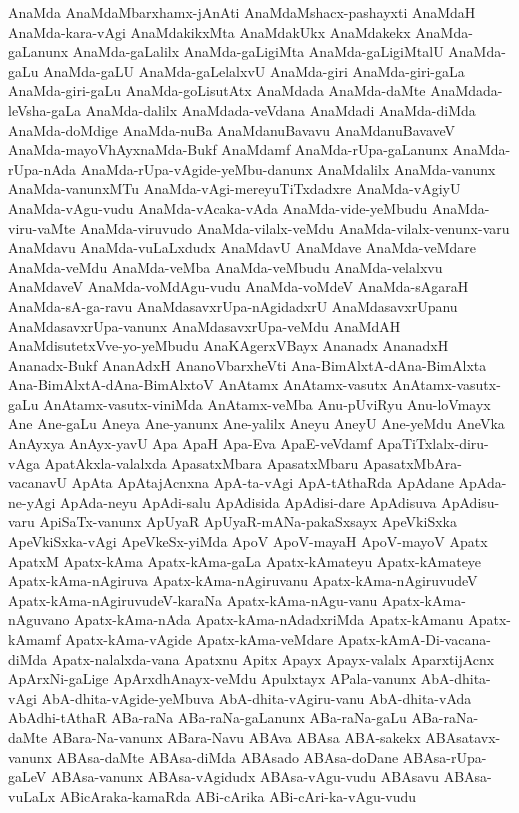 {AnaMda
AnaMdaMbarxhamx-jAnAti
AnaMdaMshacx-pashayxti
AnaMdaH
AnaMda-kara-vAgi
AnaMdakikxMta
AnaMdakUkx
AnaMdakekx
AnaMda-gaLanunx
AnaMda-gaLalilx
AnaMda-gaLigiMta
AnaMda-gaLigiMtalU
AnaMda-gaLu
AnaMda-gaLU
AnaMda-gaLelalxvU
AnaMda-giri
AnaMda-giri-gaLa
AnaMda-giri-gaLu
AnaMda-goLisutAtx
AnaMdada
AnaMda-daMte
AnaMdada-leVsha-gaLa
AnaMda-dalilx
AnaMdada-veVdana
AnaMdadi
AnaMda-diMda
AnaMda-doMdige
AnaMda-nuBa
AnaMdanuBavavu
AnaMdanuBavaveV
AnaMda-mayoVhAyxnaMda-Bukf
AnaMdamf
AnaMda-rUpa-gaLanunx
AnaMda-rUpa-nAda
AnaMda-rUpa-vAgide-yeMbu-danunx
AnaMdalilx
AnaMda-vanunx
AnaMda-vanunxMTu
AnaMda-vAgi-mereyuTiTxdadxre
AnaMda-vAgiyU
AnaMda-vAgu-vudu
AnaMda-vAcaka-vAda
AnaMda-vide-yeMbudu
AnaMda-viru-vaMte
AnaMda-viruvudo
AnaMda-vilalx-veMdu
AnaMda-vilalx-venunx-varu
AnaMdavu
AnaMda-vuLaLxdudx
AnaMdavU
AnaMdave
AnaMda-veMdare
AnaMda-veMdu
AnaMda-veMba
AnaMda-veMbudu
AnaMda-velalxvu
AnaMdaveV
AnaMda-voMdAgu-vudu
AnaMda-voMdeV
AnaMda-sAgaraH
AnaMda-sA-ga-ravu
AnaMdasavxrUpa-nAgidadxrU
AnaMdasavxrUpanu
AnaMdasavxrUpa-vanunx
AnaMdasavxrUpa-veMdu
AnaMdAH
AnaMdisutetxVve-yo-yeMbudu
AnaKAgerxVBayx
Ananadx
AnanadxH
Ananadx-Bukf
AnanAdxH
AnanoVbarxheVti
Ana-BimAlxtA-dAna-BimAlxta
Ana-BimAlxtA-dAna-BimAlxtoV
AnAtamx
AnAtamx-vasutx
AnAtamx-vasutx-gaLu
AnAtamx-vasutx-viniMda
AnAtamx-veMba
Anu-pUviRyu
Anu-loVmayx
Ane
Ane-gaLu
Aneya
Ane-yanunx
Ane-yalilx
Aneyu
AneyU
Ane-yeMdu
AneVka
AnAyxya
AnAyx-yavU
Apa
ApaH
Apa-Eva
ApaE-veVdamf
ApaTiTxlalx-diru-vAga
ApatAkxla-valalxda
ApasatxMbara
ApasatxMbaru
ApasatxMbAra-vacanavU
ApAta
ApAtajAcnxna
ApA-ta-vAgi
ApA-tAthaRda
ApAdane
ApAda-ne-yAgi
ApAda-neyu
ApAdi-salu
ApAdisida
ApAdisi-dare
ApAdisuva
ApAdisu-varu
ApiSaTx-vanunx
ApUyaR
ApUyaR-mANa-pakaSxsayx
ApeVkiSxka
ApeVkiSxka-vAgi
ApeVkeSx-yiMda
ApoV
ApoV-mayaH
ApoV-mayoV
Apatx
ApatxM
Apatx-kAma
Apatx-kAma-gaLa
Apatx-kAmateyu
Apatx-kAmateye
Apatx-kAma-nAgiruva
Apatx-kAma-nAgiruvanu
Apatx-kAma-nAgiruvudeV
Apatx-kAma-nAgiruvudeV-karaNa
Apatx-kAma-nAgu-vanu
Apatx-kAma-nAguvano
Apatx-kAma-nAda
Apatx-kAma-nAdadxriMda
Apatx-kAmanu
Apatx-kAmamf
Apatx-kAma-vAgide
Apatx-kAma-veMdare
Apatx-kAmA-Di-vacana-diMda
Apatx-nalalxda-vana
Apatxnu
Apitx
Apayx
Apayx-valalx
AparxtijAcnx
ApArxNi-gaLige
ApArxdhAnayx-veMdu
Apulxtayx
APala-vanunx
AbA-dhita-vAgi
AbA-dhita-vAgide-yeMbuva
AbA-dhita-vAgiru-vanu
AbA-dhita-vAda
AbAdhi-tAthaR
ABa-raNa
ABa-raNa-gaLanunx
ABa-raNa-gaLu
ABa-raNa-daMte
ABara-Na-vanunx
ABara-Navu
ABAva
ABAsa
ABA-sakekx
ABAsatavx-vanunx
ABAsa-daMte
ABAsa-diMda
ABAsado
ABAsa-doDane
ABAsa-rUpa-gaLeV
ABAsa-vanunx
ABAsa-vAgidudx
ABAsa-vAgu-vudu
ABAsavu
ABAsa-vuLaLx
ABicAraka-kamaRda
ABi-cArika
ABi-cAri-ka-vAgu-vudu
}
